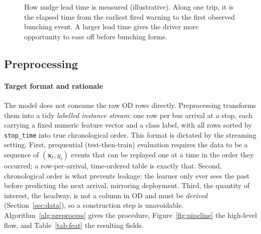 \documentclass[11pt,a4paper]{article}
\begin{document}
\begin{figure}[htbp]
\centering
{}
\caption{How nudge lead time is measured (illustrative). Along one trip, it is the elapsed time from
the earliest fired warning to the first observed bunching event. A larger lead time gives the driver
more opportunity to ease off before bunching forms.}
\label{fig:leadtime}
\end{figure}

\subsection{Preprocessing}
\label{sec:preprocessing}

\paragraph{Target format and rationale}
The model does not consume the raw OD rows directly. Preprocessing transforms them into a tidy
\emph{labelled instance stream}: one row per bus arrival at a stop, each carrying a fixed numeric
feature vector and a class label, with all rows sorted by \texttt{stop\_time} into true
chronological order. This format is dictated by the streaming setting. First, prequential
(test-then-train) evaluation requires the data to be a sequence of $(\mathbf{x}_t, y_t)$ events that
can be replayed one at a time in the order they occurred; a row-per-arrival, time-ordered table is
exactly that. Second, chronological order is what prevents leakage: the learner only ever sees the
past before predicting the next arrival, mirroring deployment. Third, the quantity of interest,
the headway, is not a column in OD and must be \emph{derived} (Section~\ref{sec:data}), so a
construction step is unavoidable. Algorithm~\ref{alg:preprocess} gives the procedure,
Figure~\ref{fig:pipeline} the high-level flow, and Table~\ref{tab:feat} the resulting fields.
\end{document}
